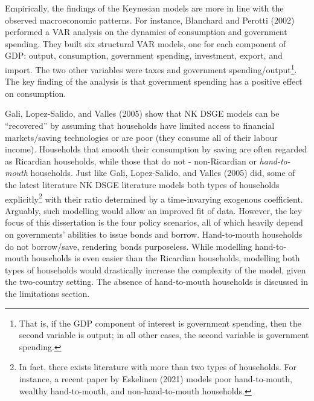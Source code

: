 Empirically, the findings of the Keynesian models are more in line with the observed macroeconomic patterns. For instance, Blanchard and Perotti (2002) performed a VAR analysis on the dynamics of consumption and government spending. They built six structural VAR models, one for each component of GDP: output, consumption, government spending, investment, export, and import. The two other variables were taxes and government spending/output\footnote{That is, if the GDP component of interest is government spending, then the second variable is output; in all other cases, the second variable is government spending.}. The key finding of the analysis is that government spending has a positive effect on consumption. 

Gali, Lopez-Salido, and Valles (2005) show that NK DSGE models can be ``recovered'' by assuming that households have limited access to financial markets/saving technologies or are poor (they consume all of their labour income). Households that smooth their consumption by saving are often regarded as Ricardian households, while those that do not - non-Ricardian or \textit{hand-to-mouth} households. Just like Gali, Lopez-Salido, and Valles (2005) did, some of the latest literature NK DSGE literature models both types of households explicitly\footnote{In fact, there exists literature with more than two types of households. For instance, a recent paper by Eskelinen (2021) models poor hand-to-mouth, wealthy hand-to-mouth, and non-hand-to-mouth households.} with their ratio determined by a time-invarying exogenous coefficient. Arguably, such modelling would allow an improved fit of data. However, the key focus of this dissertation is the four policy scenarios, all of which heavily depend on governments' abilities to issue bonds and borrow. Hand-to-mouth households do not borrow/save, rendering bonds purposeless. While modelling hand-to-mouth households is even easier than the Ricardian households, modelling both types of households would drastically increase the complexity of the model, given the two-country setting. The absence of hand-to-mouth households is discussed in the limitations section.